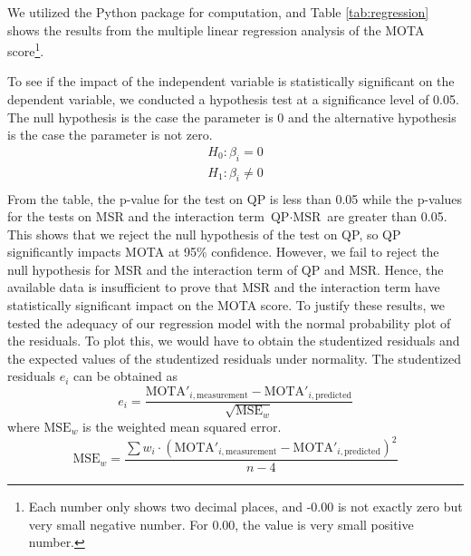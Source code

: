 We utilized the Python package \cite{seabold_statsmodels_2010} for computation, and Table \ref{tab:regression} shows the results from the multiple linear regression analysis of the MOTA score\footnote{Each number only shows two decimal places, and -0.00 is not exactly zero but very small negative number. For 0.00, the value is very small positive number.}.

To see if the impact of the independent variable is statistically significant on the dependent variable, we conducted a hypothesis test at a significance level of 0.05. The null hypothesis is the case the parameter is 0 and the alternative hypothesis is the case the parameter is not zero.
\begin{equation}
    \begin{aligned}
        H_0: \beta_i = 0 \\
        H_1: \beta_i \neq 0 \\
    \end{aligned}
\end{equation}
From the table, the p-value for the test on QP is less than 0.05 while the p-values for the tests on MSR and the interaction term $\text{QP} \cdot \text{MSR}$ are greater than 0.05. This shows that we reject the null hypothesis of the test on QP, so QP significantly impacts MOTA at 95\% confidence. However, we fail to reject the null hypothesis for MSR and the interaction term of QP and MSR. Hence, the available data is insufficient to prove that MSR and the interaction term have statistically significant impact on the MOTA score. To justify these results, we tested the adequacy of our regression model with the normal probability plot of the residuals. To plot this, we would have to obtain the studentized residuals and the expected values of the studentized residuals under normality. The studentized residuals $e_i$ can be obtained as
\begin{equation}
    e_i = \frac{ \text{MOTA}'_{i,\text{measurement}} - \text{MOTA}'_{i,\text{predicted}} }{\sqrt{\text{MSE}_w}}
    \label{eqn:residuals}
\end{equation}
where $\text{MSE}_w$ is the weighted mean squared error.
\begin{equation}
    \text{MSE}_w = \frac{\sum w_i \cdot ( \text{MOTA}'_{i,\text{measurement}} - \text{MOTA}'_{i,\text{predicted}} )^2 }{n-4}
\end{equation}
